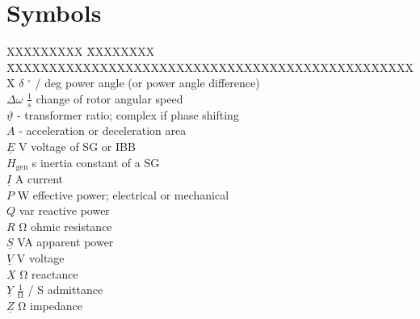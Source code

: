 \chapter*{Symbols}
\label{chap:symbols}

\begin{tabbing}
    XXXXXXXXX \= XXXXXXXX \= XXXXXXXXXXXXXXXXXXXXXXXXXXXXXXXXXXXXXXXXXXXXXXXXX \kill
    $\delta$                \> $^\circ$ / deg                   \> power angle (or power angle difference) \\
    $\Delta\omega$          \> $\mathrm{\frac{1}{s}}$           \> change of rotor angular speed \\
    $\underline{\vartheta}$ \> -                                \> transformer ratio; complex if phase shifting \\
    $A$                     \> -                                \> acceleration or deceleration area \\
    $\underline{E}$         \> V                                \> voltage of \acs{SG} or \acs{IBB} \\
    $H_\mathrm{gen}$        \> s                                \> inertia constant of a \acf{SG} \\
    $\underline{I}$         \> A                                \> current \\
    $P$                     \> W                                \> effective power; electrical or mechanical \\
    $Q$                     \> var                              \> reactive power \\
    $R$                     \> $\mathrm{\Omega}$                \> ohmic resistance \\
    $\underline{S}$         \> VA                               \> apparent power \\
    $\underline{V}$         \> V                                \> voltage \\
    $\underline{X}$         \> $\mathrm{\Omega}$                \> reactance \\
    $\underline{Y}$         \> $\mathrm{\frac{1}{\Omega}}$ / S  \> admittance \\
    $\underline{Z}$         \> $\mathrm{\Omega}$                \> impedance \\
\end{tabbing}

